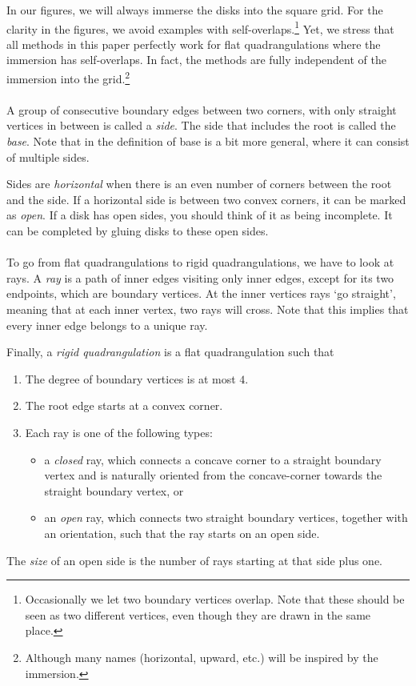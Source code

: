 \documentclass[11pt]{article}
\theoremstyle{plain}
\theoremstyle{definition}
\begin{document}
In our figures, we will always immerse the disks into the square grid. 
For the clarity in the figures, we avoid examples with self-overlaps.\footnote{Occasionally we let two boundary vertices overlap. Note that these should be seen as two different vertices, even though they are drawn in the same place.}
Yet, we stress that all methods in this paper perfectly work for flat quadrangulations where the immersion has self-overlaps. 
In fact, the methods are fully independent of the immersion into the grid.\footnote{Although many names (horizontal, upward, etc.) will be inspired by the immersion.}
\\\\
A group of consecutive boundary edges between two corners, with only straight vertices in between is called a \emph{side}. 
The side that includes the root is called the \emph{base}.
Note that in \cite{Budd_rectilinear_2025} the definition of base is a bit more general, where it can consist of multiple sides.

Sides are \emph{horizontal} when there is an even number of corners between the root and the side.
If a horizontal side is between two convex corners, it can be marked as \emph{open}.
If a disk has open sides, you should think of it as being incomplete.
It can be completed by gluing disks to these open sides.
\\\\
To go from flat quadrangulations to rigid quadrangulations, we have to look at rays.
A \emph{ray} is a path of inner edges visiting only inner edges, except for its two endpoints, which are boundary vertices. At the inner vertices rays `go straight', meaning that at each inner vertex, two rays will cross.
Note that this implies that every inner edge belongs to a unique ray.

Finally, a \emph{rigid quadrangulation} is a flat quadrangulation such that
\begin{enumerate}
    \item The degree of boundary vertices is at most $4$.
    \item The root edge starts at a convex corner.
    \item Each ray is one of the following types: 
    \begin{itemize}
        \item a \emph{closed} ray, which connects a concave corner to a straight boundary vertex and is naturally oriented from the concave-corner towards the straight boundary vertex, or
        \item an \emph{open} ray, which connects two straight boundary vertices, together with an orientation, such that the ray starts on an open side.
    \end{itemize}
\end{enumerate}
The \emph{size} of an open side is the number of rays starting at that side plus one.
\end{document}
